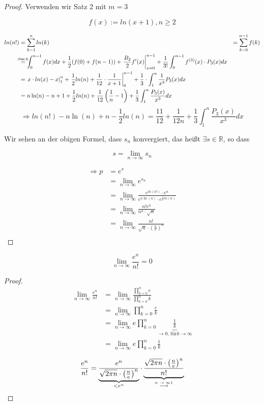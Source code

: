 \documentclass[12pt]{article}
\newcommand{\overtext}[2]{\mathrel{\overset{\makebox[0pt]{\mbox{\normalfont\tiny\sffamily #2}}}{#1}}}
\begin{document}
\begin{proof}
Verwenden wir Satz 2 mit \(m = 3\)

\[f(x) := ln(x+1), n \geq 2\]

\begin{align*}
ln(n!) &= \sum_{k=1}^n ln(k) &= \sum_{k=0}^{n-1} f(k) \\
&\overtext{=}{(Satz 2)} \int_0^{n-1} f(x) dx + \frac{1}{2}(f(0)+f(n-1)) + \left. \frac{B_2}{2} f'(x) \right|_{x=0}^{n-1} + \frac{1}{3!} \int_0^{n-1} f^{(3)}(x) \cdot P_3(x) dx \\
&= \left. x \cdot ln(x) - x \right|_1^n + \left. \frac{1}{2}ln(n) + \frac{1}{12}\cdot\frac{1}{x+1} \right|_0^{n-1} + \frac{1}{3}\cdot\int_1^n \frac{1}{x^3} P_3(x) dx \\
&= n\ln(n) - n + 1 + \frac{1}{2} ln(n) + \frac{1}{12}\left(\frac{1}{n} - 1\right) + \frac{1}{3} \int_1^n \frac{P_3(x)}{x^3} dx \\
\end{align*}
\[\Longrightarrow ln(n!) - n\ln(n) + n - \frac{1}{2}ln(n) = \frac{11}{12} + \frac{1}{12n} + \frac{1}{3} \int_1^n \frac{P_3(x)}{x^3} dx\]

Wir sehen an der obigen Formel, dass \(s_n\) konvergiert, das heißt \(\exists s\in\mathbb{R}\), so dass

\[s = \lim_{n\to\infty} s_n\]

\begin{align*}
\Longrightarrow p &= e^s \\
&= \lim_{n\to\infty} e^{s_n} \\
&= \lim_{n\to\infty} \frac{e^{ln(n!)} \cdot e^n}{e^{n\ln(n)}\cdot e^{\frac{1}{2}ln(n)}} \\
&= \lim_{n\to\infty} \frac{n!e^n}{n^n\cdot\sqrt{n}} \\
&= \lim_{n\to\infty} \frac{n!}{\sqrt{n}\cdot\left(\frac{n}{e}\right)^n} \\
\end{align*}
\end{proof}

\begin{theorem}
\[\lim_{n\to\infty} \frac{e^n}{n!} = 0\]
\end{theorem}
\begin{proof}
\begin{align*}
\lim_{n\to\infty} \frac{e^n}{n!} &= \lim_{n\to\infty} \frac{\prod_{k=0}^n e}{\prod_{k=0}^n k} \\
&= \lim_{n\to\infty} \prod_{k=0}^n \frac{e}{k} \\
&= \lim_{n\to\infty} e \prod_{k=0}^n \underbrace{\frac{1}{k}}_{\to 0\text{, für}k\to\infty} \\
&= \lim_{n\to\infty} e \prod_{k=0}^n \frac{1}{k} \\
\end{align*}
\begin{align*}
\frac{e^n}{n!} &= \underbrace{\frac{e^n}{\sqrt{2\pi n}\cdot\left(\frac{n}{e}\right)^n}}_{< e^n} \cdot \underbrace{\frac{\sqrt{2\pi n}\cdot\left(\frac{n}{e}\right)^n}{n!}}_{\overtext{\longrightarrow}{\(n\to\infty1\)}} \\
\end{align*}
\end{proof}
\end{document}
